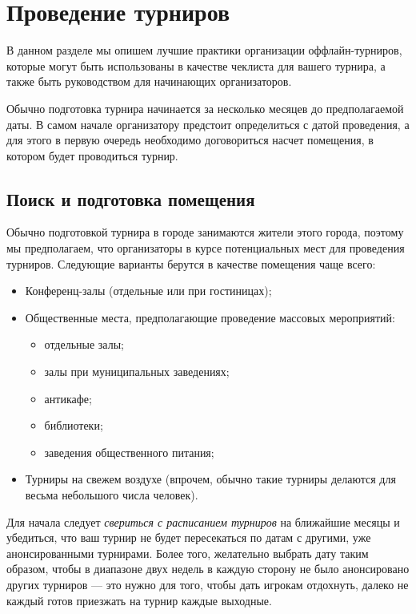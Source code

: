 \section{Проведение турниров}

В данном разделе мы опишем лучшие практики организации оффлайн-турниров, которые могут быть использованы в качестве чеклиста для вашего турнира, а также быть руководством для начинающих организаторов.

Обычно подготовка турнира начинается за несколько месяцев до предполагаемой даты. В самом начале организатору предстоит определиться с датой проведения, а для этого в первую очередь необходимо договориться насчет помещения, в котором будет проводиться турнир.

\subsection{Поиск и подготовка помещения}

Обычно подготовкой турнира в городе занимаются жители этого города, поэтому мы предполагаем, что организаторы в курсе потенциальных мест для проведения турниров. Следующие варианты берутся в качестве помещения чаще всего:
\begin{itemize}
	\item Конференц-залы (отдельные или при гостиницах);
	\item Общественные места, предполагающие проведение массовых мероприятий:
	\begin{itemize}
		\item отдельные залы;
		\item залы при муниципальных заведениях;
		\item антикафе;
		\item библиотеки;
		\item заведения общественного питания;
	\end{itemize}
	\item Турниры на свежем воздухе (впрочем, обычно такие турниры делаются для весьма небольшого числа человек).
\end{itemize}

Для начала следует \textit{свериться с расписанием турниров} на ближайшие месяцы и убедиться, что ваш турнир не будет пересекаться по датам с другими, уже анонсированными турнирами. Более того, желательно выбрать дату таким образом, чтобы в диапазоне двух недель в каждую сторону не было анонсировано других турниров --- это нужно для того, чтобы дать игрокам отдохнуть, далеко не каждый готов приезжать на турнир каждые выходные.

